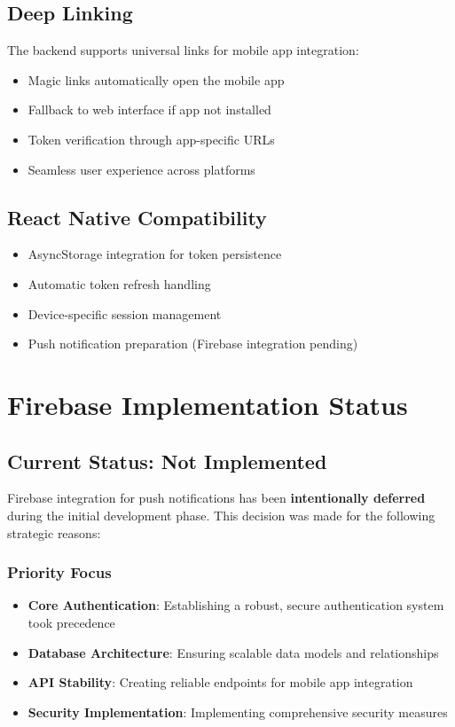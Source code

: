\documentclass[12pt,a4paper]{article}
\begin{document}
\subsection{Deep Linking}
The backend supports universal links for mobile app integration:

\begin{itemize}
    \item Magic links automatically open the mobile app
    \item Fallback to web interface if app not installed
    \item Token verification through app-specific URLs
    \item Seamless user experience across platforms
\end{itemize}

\subsection{React Native Compatibility}
\begin{itemize}
    \item AsyncStorage integration for token persistence
    \item Automatic token refresh handling
    \item Device-specific session management
    \item Push notification preparation (Firebase integration pending)
\end{itemize}

\section{Firebase Implementation Status}

\subsection{Current Status: Not Implemented}

Firebase integration for push notifications has been \textbf{intentionally deferred} during the initial development phase. This decision was made for the following strategic reasons:

\subsubsection{Priority Focus}
\begin{itemize}
    \item \textbf{Core Authentication}: Establishing a robust, secure authentication system took precedence
    \item \textbf{Database Architecture}: Ensuring scalable data models and relationships
    \item \textbf{API Stability}: Creating reliable endpoints for mobile app integration
    \item \textbf{Security Implementation}: Implementing comprehensive security measures
\end{itemize}
\end{document}
